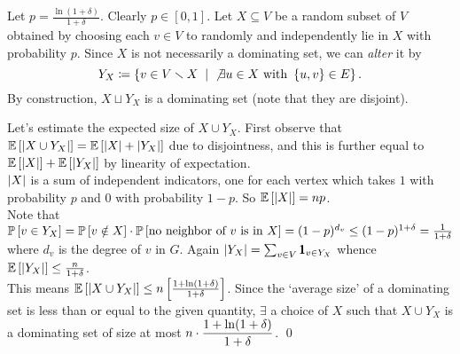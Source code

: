 \begin{pf}
Let $p=\frac{\ln(1+\delta)}{1+\delta}$. Clearly $p\in [0,1]$. Let $X\subseteq V$
 be a random subset of $V$ obtained by choosing each $v\in V$ to randomly and independently lie in $X$ with probability $p$. Since $X$ is not necessarily a dominating set, we can \textit{alter} it by $$Y_X\sett\set{v\in V\smallsetminus X\st \not\exists u\in X \text{ with } \set{u,v}\in E}.$$
By construction, $X\sqcup Y_X$ is a dominating set (note that they are disjoint).

Let's estimate the expected size of $X\cup Y_X$. First observe that $\E{\abs{X\cup Y_X}} = \E{\abs X + \abs {Y_X}}$ due to disjointness, and this is further equal to $\E{\abs X} + \E{\abs {Y_X}}$ by linearity of expectation.\\
$\abs X$ is a sum of independent indicators, one for each vertex which takes $1$ with probability $p$ and $0$ with probability $1-p$. So $\E{\abs X} = np$.\\
Note that $\P{v\in Y_X} = \P{v\notin X}\cdot \P{\text{no neighbor of } v \text{ is in } X} = (1-p)^{d_v} \leq (1-p)^{1+\delta} =\frac{1}{1+\delta}$ where $d_v$ is the degree of $v$ in $G$. Again $\abs{Y_X} = \sum_{v\in V} \pmb 1_{v\in Y_X}$ whence $\E{\abs {Y_X}} \leq \frac n {1+\delta}$. \\
This means $\E{\abs{X\cup Y_X}} \leq n\left[\frac{1+\ln(1+\delta)}{1+\delta}\right]$. Since the `average size' of a dominating set is less than or equal to the given quantity, $\exists$ a choice of $X$ such that $X\cup Y_X$ is a dominating set of size at most $\ds n\cdot \frac{1+\ln(1+\delta)}{1+\delta}$.
\qed\end{pf}





